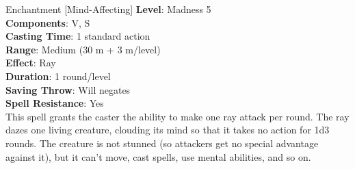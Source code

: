 {Enchantment [Mind-Affecting]}
{
	\textbf{Level}: Madness 5\\
	\textbf{Components}: V, S\\
	\textbf{Casting Time}: 1 standard action\\
	\textbf{Range}: Medium (30 m + 3 m/level)\\
	\textbf{Effect}: Ray\\
	\textbf{Duration}: 1 round/level\\
	\textbf{Saving Throw}: Will negates\\
	\textbf{Spell Resistance}: Yes\\
}
{
	This spell grants the caster the ability to make one ray attack per round. The ray dazes one living creature, clouding its mind so that it takes no action for 1d3 rounds. The creature is not stunned (so attackers get no special advantage against it), but it can't move, cast spells, use mental abilities, and so on.
}